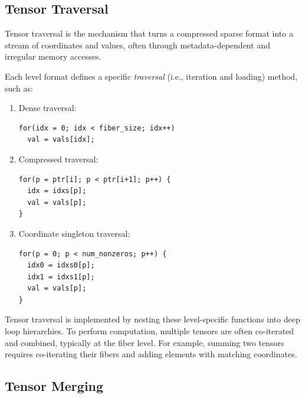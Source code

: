 \subsection{Tensor Traversal} \label{sec:tensor-traversal} %

Tensor traversal is the mechanism that turns a compressed sparse format into a stream of coordinates and values, often through metadata-dependent and irregular memory accesses.

Each level format defines a specific \emph{traversal} (i.e., iteration and loading) method, such as:
\begin{enumerate}
\item Dense traversal:
\begin{small}
\begin{verbatim}
for(idx = 0; idx < fiber_size; idx++)
  val = vals[idx];
\end{verbatim}
\end{small}

\item Compressed traversal:
\begin{small}
\begin{verbatim}
for(p = ptr[i]; p < ptr[i+1]; p++) {
  idx = idxs[p];
  val = vals[p];
}
\end{verbatim}
\end{small}

\item Coordinate singleton traversal:
\begin{small}
\begin{verbatim}
for(p = 0; p < num_nonzeros; p++) {
  idx0 = idxs0[p];
  idx1 = idxs1[p];
  val = vals[p];
}
\end{verbatim}
\end{small}
\end{enumerate}

Tensor traversal is implemented by nesting these level-specific functions into deep loop hierarchies. To perform computation, multiple tensors are often co-iterated and combined, typically at the fiber level. For example, summing two tensors requires co-iterating their fibers and adding elements with matching coordinates.

\subsection{Tensor Merging} \label{sec:tensor-merging} %

